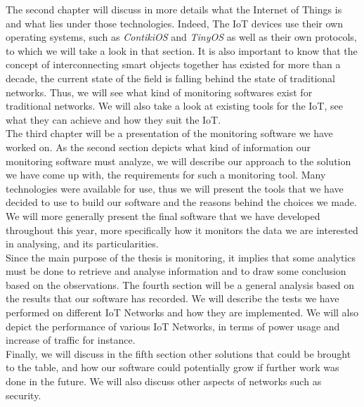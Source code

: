 The second chapter will discuss in more details what the Internet of Things is and what lies under those technologies. Indeed, The IoT devices use their own operating systems, such as \textit{ContikiOS} and \textit{TinyOS} as well as their own protocols, to which we will take a look in that section. It is also important to know that the concept of interconnecting smart objects together has existed for more than a decade, the current state of the field is falling behind the state of traditional networks. Thus, we will see what kind of monitoring softwares exist for traditional networks. We will also take a look at existing tools for the IoT, see what they can achieve and how they suit the IoT.\\

The third chapter will be a presentation of the monitoring software we have worked on. As the second section depicts what kind of information our monitoring software must analyze, we will describe our approach to the solution we have come up with, the requirements for such a monitoring tool. Many technologies were available for use, thus we will present the tools that we have decided to use to build our software and the reasons behind the choices we made. We will more generally present the final software that we have developed throughout this year, more specifically how it monitors the data we are interested in analysing, and its particularities. \\

Since the main purpose of the thesis is monitoring, it implies that some analytics must be done to retrieve and analyse information and to draw some conclusion based on the observations. The fourth section will be a general analysis based on the results that our software has recorded. We will describe the tests we have performed on different IoT Networks and how they are implemented. We will also depict the performance of various IoT Networks, in terms of power usage and increase of traffic for instance.\\

Finally, we will discuss in the fifth section other solutions that could be brought to the table, and how our software could potentially grow if further work was done in the future. We will also discuss other aspects of networks such as security.
